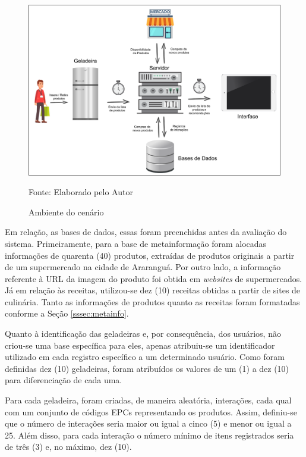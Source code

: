 \begin{figure}[htb]
    \caption{Ambiente do cenário}
    \label{fig:cap5_ambiente-cenario}
    \includegraphics[width=\textwidth]{figuras/cap5_cenario.png}
    
    \footnotesize{Fonte: Elaborado pelo Autor}
\end{figure}

Em relação, as bases de dados, essas foram preenchidas antes da avaliação do sistema. 
Primeiramente, para a base de metainformação foram alocadas informações de quarenta (40) produtos, extraídas de produtos originais a partir de um supermercado na cidade de Araranguá. Por outro lado, a informação referente à URL da imagem do produto foi obtida em \textit{websites} de supermercados.
Já em relação às receitas, utilizou-se dez (10) receitas obtidas a partir de sites de culinária. Tanto as informações de produtos quanto as receitas foram formatadas conforme a Seção \ref{sssec:metainfo}.

Quanto à identificação das geladeiras e, por consequência, dos usuários, não criou-se uma base específica para eles, apenas atribuiu-se um identificador utilizado em cada registro específico a um determinado usuário. Como foram definidas dez (10) geladeiras, foram atribuídos os valores de um (1) a dez (10) para diferenciação de cada uma.

Para cada geladeira, foram criadas, de maneira aleatória, interações, cada qual com um conjunto de códigos EPCs representando os produtos. Assim, definiu-se que o número de interações seria maior ou igual a cinco (5) e menor ou igual a 25. Além disso, para cada interação o número mínimo de itens registrados seria de três (3) e, no máximo, dez (10).

